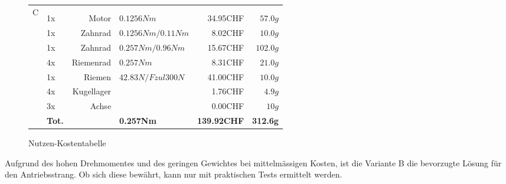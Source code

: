 \begin{figure}[h!]
\begin{tabular}{p{0.5cm}p{0.8cm}rp{3cm}rr}
    \multirow{9}[2]{*}{C} 
          &       &                 &                      &          &  \\
          &       &                 &                      &          &  \\
          & 1x    & Motor           & $0.1256 Nm$          & 34.95CHF & $57.0 g$ \\
          & 1x    & Zahnrad         & $0.1256 Nm / 0.11 Nm$& 8.02CHF  & $10.0 g$ \\
          & 1x    & Zahnrad         & $0.257 Nm / 0.96 Nm$ & 15.67CHF & $102.0 g$ \\
          & 4x    & Riemenrad       & $0.257 Nm$           & 8.31CHF  & $21.0 g$ \\
          & 1x    & Riemen          & $42.83 N /Fzul 300 N $ & 41.00CHF & $10.0 g$ \\
          & 4x    & Kugellager      &                      & 1.76CHF  & $4.9 g$ \\
          & 3x    & Achse           &                      & 0.00CHF  & $10 g$ \\
          & \textbf{Tot.} &       & \textbf{0.257Nm} & \textbf{139.92CHF} & \textbf{312.6g} \\
    \end{tabular}%
 	\centering
    \caption{Nutzen-Kostentabelle}
    \label{tab:addlabel}%
\end{figure}
Aufgrund des hohen Drehmomentes und des geringen Gewichtes bei mittelmässigen Kosten, ist die Variante B die bevorzugte Lösung für den Antriebsstrang. Ob sich diese bewährt, kann nur mit praktischen Tests ermittelt werden.

